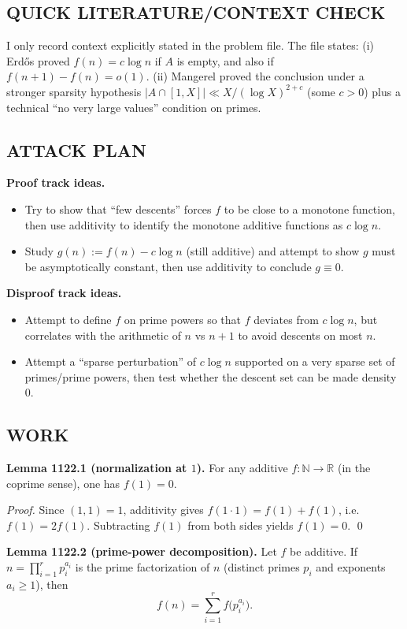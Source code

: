 \subsection*{QUICK LITERATURE/CONTEXT CHECK}
I only record context explicitly stated in the problem file.
The file states:
(i) Erd\H{o}s proved $f(n)=c\log n$ if $A$ is empty, and also if $f(n+1)-f(n)=o(1)$.
(ii) Mangerel proved the conclusion under a stronger sparsity hypothesis $\lvert A\cap[1,X]\rvert\ll X/(\log X)^{2+c}$ (some $c>0$) plus a technical ``no very large values'' condition on primes.

\subsection*{ATTACK PLAN}
\textbf{Proof track ideas.}
\begin{itemize}
\item Try to show that ``few descents'' forces $f$ to be close to a monotone function, then use additivity to identify the monotone additive functions as $c\log n$.
\item Study $g(n):=f(n)-c\log n$ (still additive) and attempt to show $g$ must be asymptotically constant, then use additivity to conclude $g\equiv 0$.
\end{itemize}
\textbf{Disproof track ideas.}
\begin{itemize}
\item Attempt to define $f$ on prime powers so that $f$ deviates from $c\log n$, but correlates with the arithmetic of $n$ vs $n+1$ to avoid descents on most $n$.
\item Attempt a ``sparse perturbation'' of $c\log n$ supported on a very sparse set of primes/prime powers, then test whether the descent set can be made density $0$.
\end{itemize}

\subsection*{WORK}
\textbf{Lemma 1122.1 (normalization at $1$).}
For any additive $f:\mathbb{N}\to\mathbb{R}$ (in the coprime sense), one has $f(1)=0$.

\emph{Proof.}
Since $(1,1)=1$, additivity gives $f(1\cdot 1)=f(1)+f(1)$, i.e. $f(1)=2f(1)$. Subtracting $f(1)$ from both sides yields $f(1)=0$. \qed

\textbf{Lemma 1122.2 (prime-power decomposition).}
Let $f$ be additive. If $n=\prod_{i=1}^r p_i^{a_i}$ is the prime factorization of $n$ (distinct primes $p_i$ and exponents $a_i\ge 1$), then
\[
 f(n)=\sum_{i=1}^r f\bigl(p_i^{a_i}\bigr).
\]


